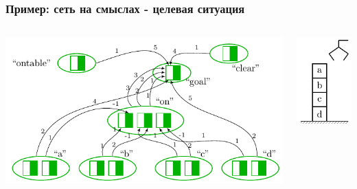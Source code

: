 \documentclass[default]{beamer}
\begin{document}
	\begin{frame}
		\frametitle{Пример: сеть на смыслах - целевая ситуация}
		\begin{columns}
			\begin{column}{0.7\textwidth}
				\centering
				\includegraphics[page=1,width=\textwidth]{plan/plan_nets}
			\end{column}
			\begin{column}{0.3\textwidth}
				\centering
				\includegraphics[page=1,width=\textwidth]{plan/block_world}
			\end{column}
		\end{columns}
	\end{frame}	
	
\end{document}
